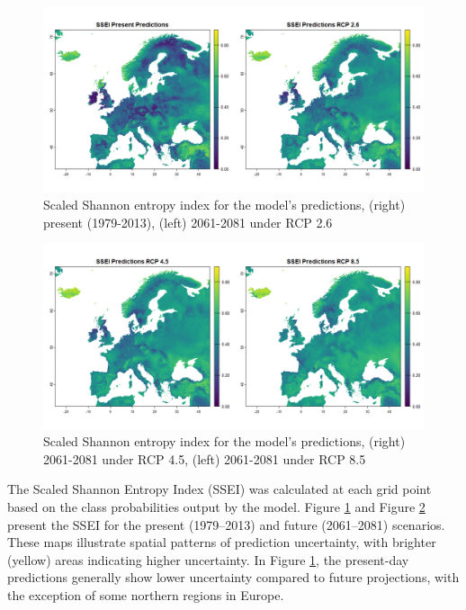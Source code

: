 \documentclass[
]{krantz}
\begin{document}
\begin{figure}

{\centering \includegraphics[width=1\linewidth]{work/05-naturalveg/figures/combined_ssei1} 

}

\caption{Scaled Shannon entropy index for the model's predictions, (right) present (1979-2013), (left) 2061-2081 under RCP 2.6}\label{fig:ssei1}
\end{figure}

\begin{figure}

{\centering \includegraphics[width=1\linewidth]{work/05-naturalveg/figures/combined_ssei2} 

}

\caption{Scaled Shannon entropy index for the model's predictions, (right) 2061-2081 under RCP 4.5, (left) 2061-2081 under RCP 8.5}\label{fig:ssei2}
\end{figure}

The Scaled Shannon Entropy Index (SSEI) was calculated at each grid point based on the class probabilities output by the model. Figure \ref{fig:ssei1} and Figure \ref{fig:ssei2} present the SSEI for the present (1979--2013) and future (2061--2081) scenarios. These maps illustrate spatial patterns of prediction uncertainty, with brighter (yellow) areas indicating higher uncertainty. In Figure \ref{fig:ssei1}, the present-day predictions generally show lower uncertainty compared to future projections, with the exception of some northern regions in Europe.
\end{document}
